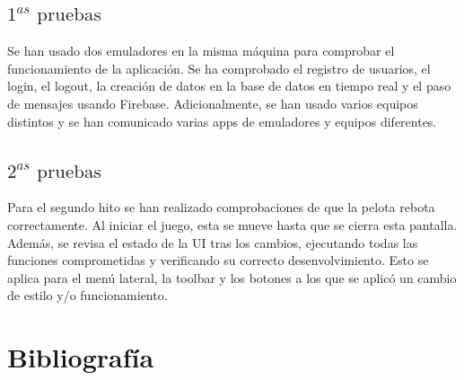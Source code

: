 \documentclass[a4paper,openright,12pt]{article}
\begin{document}
\subsection{$1^{as} \text{ pruebas}$}
Se han usado dos emuladores en la misma máquina para comprobar el funcionamiento de la aplicación. Se ha comprobado el registro de usuarios, el login, el logout, la creación de datos en la base de datos en tiempo real y el paso de mensajes usando Firebase. Adicionalmente, se han usado varios equipos distintos y se han comunicado varias apps de emuladores y equipos diferentes.

\subsection{$2^{as} \text{ pruebas}$}
Para el segundo hito se han realizado comprobaciones de que la pelota rebota correctamente. Al iniciar el juego, esta se mueve hasta que se cierra esta pantalla. Además, se revisa el estado de la UI tras los cambios, ejecutando todas las funciones comprometidas y verificando su correcto desenvolvimiento. Esto se aplica para el menú lateral, la toolbar y los botones a los que se aplicó un cambio de estilo y/o funcionamiento.


\section{Bibliografía}


\end{document}
